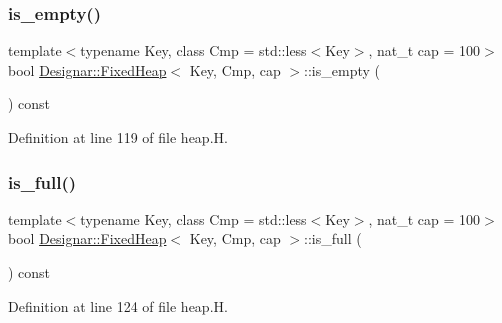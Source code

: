 \subsubsection{\texorpdfstring{is\+\_\+empty()}{is\_empty()}}
{\footnotesize\ttfamily template$<$typename Key, class Cmp = std\+::less$<$\+Key$>$, nat\+\_\+t cap = 100$>$ \\
bool \hyperlink{class_designar_1_1_fixed_heap}{Designar\+::\+Fixed\+Heap}$<$ Key, Cmp, cap $>$\+::is\+\_\+empty (\begin{DoxyParamCaption}{ }\end{DoxyParamCaption}) const\hspace{0.3cm}{\ttfamily [inline]}}



Definition at line 119 of file heap.\+H.

\mbox{\label{class_designar_1_1_fixed_heap_a85af858c5200cd8777925e4ae17ca9d2}} 
\subsubsection{\texorpdfstring{is\+\_\+full()}{is\_full()}}
{\footnotesize\ttfamily template$<$typename Key, class Cmp = std\+::less$<$\+Key$>$, nat\+\_\+t cap = 100$>$ \\
bool \hyperlink{class_designar_1_1_fixed_heap}{Designar\+::\+Fixed\+Heap}$<$ Key, Cmp, cap $>$\+::is\+\_\+full (\begin{DoxyParamCaption}{ }\end{DoxyParamCaption}) const\hspace{0.3cm}{\ttfamily [inline]}}



Definition at line 124 of file heap.\+H.

\mbox{\label{class_designar_1_1_fixed_heap_adb8f27056847e1b788e815db1a59db67}} 

